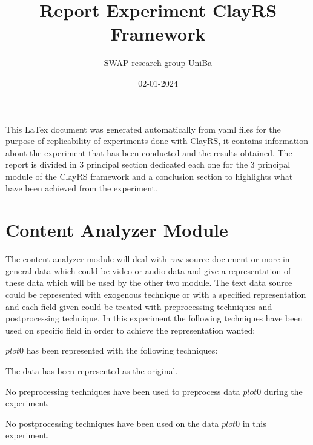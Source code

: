 \documentclass[11pt]{article}
\title{Report Experiment ClayRS Framework}
\author{SWAP research group UniBa}
\date{02-01-2024}
\begin{document}
\maketitle
This LaTex document was generated automatically from yaml files for the purpose of replicability of experiments done with
\href{https://github.com/swapUniba/ClayRS}{ClayRS},
it contains information about the experiment that has been conducted and the results obtained.
The report is divided in 3 principal section dedicated each one for the 3 principal module of the ClayRS framework
and a conclusion section to highlights what have been achieved from the experiment.
\hfill\break
\hfill\break



\section{Content Analyzer Module}\label{sec:ca}
The content analyzer module will deal with raw source document or more in general data which could be
video or audio data and give a representation of these data which will be used by the other two module.
The text data source could be represented with exogenous technique or with a specified representation
and each field given could be treated with preprocessing techniques and postprocessing technique.
In this experiment the following techniques have been used on specific field in order to achieve the
representation wanted:
\hfill\break
\hfill\break



$ plot0 $  has been represented with the following techniques:
\hfill\break
\hfill\break



The data has been represented as the original.
\hfill\break
\hfill\break



No preprocessing techniques have been used to preprocess data $ plot0 $ during the experiment.
\hfill\break
\hfill\break



No postprocessing techniques have been used on the data $ plot0 $ in this experiment.
\hfill\break
\hfill\break
\end{document}
